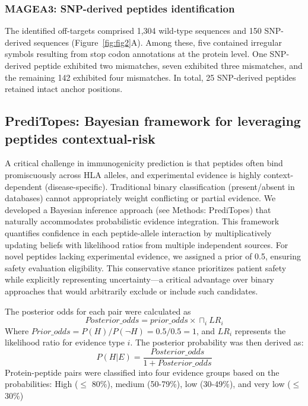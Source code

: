 \documentclass[unnumsec,webpdf,contemporary,large]{oup-authoring-template}%
\theoremstyle{thmstyleone}%
\theoremstyle{thmstyletwo}%
\theoremstyle{thmstylethree}%
\begin{document}
        \subsubsection{\textbf{MAGEA3: SNP-derived peptides identification}}
            The identified off-targets comprised 1,304 wild-type sequences and 150 SNP-derived sequences (Figure~\ref{fig:fig2}A). Among these, five contained irregular symbols resulting from stop codon annotations at the protein level. One SNP-derived peptide exhibited two mismatches, seven exhibited three mismatches, and the remaining 142 exhibited four mismatches. In total, 25 SNP-derived peptides retained intact anchor positions. 

    \subsection{\textbf{PrediTopes: Bayesian framework for leveraging peptides contextual-risk}}
        A critical challenge in immunogenicity prediction is that peptides often bind promiscuously across HLA alleles, and experimental evidence is highly context-dependent (disease-specific). Traditional binary classification (present/absent in databases) cannot appropriately weight conflicting or partial evidence.
        We developed a Bayesian inference approach (see Methods: PrediTopes) that naturally accommodates probabilistic evidence integration. This framework quantifies confidence in each peptide-allele interaction by multiplicatively updating beliefs with likelihood ratios from multiple independent sources. For novel peptides lacking experimental evidence, we assigned a prior of 0.5, ensuring safety evaluation eligibility. This conservative stance prioritizes patient safety while explicitly representing uncertainty—a critical advantage over binary approaches that would arbitrarily exclude or include such candidates.
        
        The posterior odds for each pair were calculated as 
        \begin{equation}
            Posterior\_odds= prior\_odds \times \sqcap_i LR_i
        \end{equation}
        Where $Prior\_odds=P(H)/P(¬H) =0.5/0.5=1$, and $LR_i$ represents the likelihood ratio for evidence type $i$. The posterior probability was then derived as:
        \begin{equation}
            P(H|E)=\frac{Posterior\_odds}{1+Posterior\_odds}
        \end{equation}
        Protein-peptide pairs were classified into four evidence groups based on the probabilities: High ($\leq$ 80\%), medium (50-79\%), low (30-49\%), and very low ($\leq$ 30\%)  
        
\end{document}

